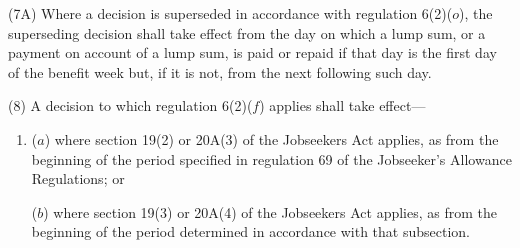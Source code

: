 \documentclass[12pt,a4paper]{article}
\begin{document}
(7A) Where a decision is superseded in accordance with regulation 6(2)($o$), the superseding decision shall take effect from the day on which a lump sum, or a payment on account of a lump sum, is paid or repaid if that day is the first day of the benefit week but, if it is not, from the next following such day.

%

(8) A decision to which regulation 6(2)($f$)  applies shall take effect—
\begin{enumerate}\item[]
($a$) where section 19(2) 
or 20A(3)  %
of the Jobseekers Act applies, as from the beginning of the period specified in regulation 69 of the Jobseeker’s Allowance Regulations; or

($b$) where section 19(3) 
or 20A(4)  %
of the Jobseekers Act applies, as from the beginning of the period determined in accordance with that subsection.
\end{enumerate}
\end{document}
